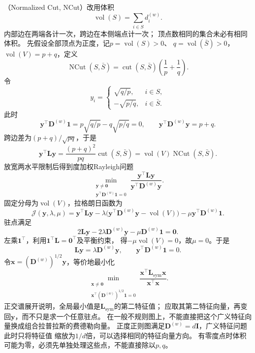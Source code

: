 （Normalized Cut, NCut）改用体积
\[
  \operatorname{vol}(S)=\sum_{i\in S}d_i^{(w)}.
\]
内部边在两端各计一次，跨边在本侧端点计一次；
顶点数相同的集合未必有相同体积。
先假设全部顶点为正度，记\(p=\operatorname{vol}(S)>0\)、
\(q=\operatorname{vol}(\bar S)>0\)，\(\operatorname{vol}(V)=p+q\)，定义
\begin{equation}
  \operatorname{NCut}(S,\bar S)
  =\operatorname{cut}(S,\bar S)\left(\frac1p+\frac1q\right).
  \label{eq:graph-theory-normalized-cut}
\end{equation}
令
\[
  y_i=
  \begin{cases}
    \sqrt{q/p},&i\in S,\\
    -\sqrt{p/q},&i\in\bar S.
  \end{cases}
\]
此时
\[
  \bm y^\top\bm D^{(w)}\bm1=p\sqrt{q/p}-q\sqrt{p/q}=0,
  \qquad
  \bm y^\top\bm D^{(w)}\bm y=p+q.
\]
跨边差为\((p+q)/\sqrt{pq}\)，于是
\[
  \bm y^\top\bm L\bm y
  =\frac{(p+q)^2}{pq}\operatorname{cut}(S,\bar S)
  =\operatorname{vol}(V)\operatorname{NCut}(S,\bar S).
\]
放宽两水平限制后得到度加权Rayleigh问题
\begin{equation}
  \min_{\substack{\bm y\neq\bm0\\
       \bm y^\top\bm D^{(w)}\bm1=0}}
       \frac{\bm y^\top\bm L\bm y}{\bm y^\top\bm D^{(w)}\bm y}.
  \label{eq:graph-theory-normalized-cut-relaxation}
\end{equation}
固定分母为\(\operatorname{vol}(V)\)，拉格朗日函数为
\[
  \mathcal J(\bm y,\lambda,\mu)
  =\bm y^\top\bm L\bm y
  -\lambda\bigl(\bm y^\top\bm D^{(w)}\bm y-\operatorname{vol}(V)\bigr)
  -\mu\bm y^\top\bm D^{(w)}\bm1.
\]
驻点满足
\[
  2\bm L\bm y-2\lambda\bm D^{(w)}\bm y-\mu\bm D^{(w)}\bm1=\bm0.
\]
左乘\(\bm1^\top\)，利用\(\bm1^\top\bm L=\bm0^\top\)及平衡约束，
得\(-\mu\operatorname{vol}(V)=0\)，故\(\mu=0\)。于是
\begin{equation}
  \bm L\bm y=\lambda\bm D^{(w)}\bm y,\qquad
  \bm y^\top\bm D^{(w)}\bm1=0.
  \label{eq:graph-theory-normalized-cut-generalized-eigenproblem}
\end{equation}
令\(\bm x=(\bm D^{(w)})^{1/2}\bm y\)，等价地最小化
\[
  \min_{\substack{\bm x\neq\bm0\\
     \bm x^\top(\bm D^{(w)})^{1/2}\bm1=0}}
     \frac{\bm x^\top\bm L_{\mathrm{sym}}\bm x}{\bm x^\top\bm x}.
\]
正交谱展开说明，全局最小值是\(\bm L_{\mathrm{sym}}\)的第二特征值；
应取其第二特征向量，再变回\(\bm y\)，而不只是求一个任意驻点。
在一般不规则图上，不能直接把这个广义特征向量换成组合拉普拉斯的费德勒向量。
正度正则图满足\(\bm D^{(w)}=d\bm I\)，广义特征问题此时只将特征值
缩放为\(1/d\)倍，可以选择相同的特征向量方向。
有零度点时体积可能为零，必须先单独处理这些点，不能直接除以\(p,q\)。

